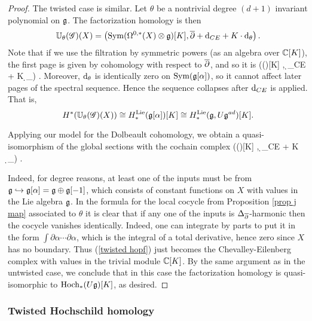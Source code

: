 \begin{proof}
The twisted case is similar. 
Let $\theta$ be a nontrivial degree $(d+1)$ invariant polynomial on $\mathfrak g$. 
The factorization homology is then 
\[
\mathbb U_\theta (\mathscr G)(X) = \left({\rm Sym}(\Omega^{0,*}(X) \otimes \mathfrak g)[K] , \overline{\partial} + {\rm d}_{CE} + K \cdot {\rm d}_\theta\right) .
\]
Note that if we use the filtration by symmetric powers (as an algebra over $\mathbb C[K]$),
the first page is given by cohomology with respect to $\overline{\partial}$,
and so it is
\beqn\label{twisted hopf}
\left(\Sym(\fg[\alpha])[K] ,  \d_{CE} + K \cdot \d_\theta \right) .
\eeqn
Moreover, ${\rm d}_\theta$ is identically zero on ${\rm Sym}(\mathfrak g[\alpha])$, so it cannot affect later pages of the spectral sequence. 
Hence the sequence collapses after ${\rm d}_{CE}$ is applied.
That is, 
\[
H^*(\mathbb U_\theta (\mathscr G)(X)) \cong H^{\rm Lie}_*(\mathfrak g[\alpha])[K] \cong H^{\rm Lie}_*(\mathfrak g, U\mathfrak g^{ad})[K].
\]

Applying our model for the Dolbeault cohomology, we obtain a quasi-isomorphism of the global sections with the cochain complex
\beqn\label{twisted hopf}
\left(\Sym(\fg[\alpha])[K] ,  \d_{CE} + K \cdot \d_\theta \right) .
\eeqn

Indeed, for degree reasons, at least one of the inputs must be from $\mathfrak g \hookrightarrow \mathfrak g[\alpha] = \mathfrak g \oplus \mathfrak g[-1]$, which consists of constant functions on $X$ with values in the Lie algebra $\mathfrak g$. 
In the formula for the local cocycle from Proposition \ref{prop j map} associated to $\theta$ it is clear that if any one of the inputs is $\Delta_{\overline{\partial}}$-harmonic then the cocycle vanishes identically. 
Indeed, one can integrate by parts to put it in the form $\int \partial \alpha \cdots \partial \alpha$, which is the integral of a total derivative, hence zero since $X$ has no boundary.
Thus (\ref{twisted hopf}) just becomes the Chevalley-Eilenberg complex with values in the trivial module $\mathbb C[K]$. 
By the same argument as in the untwisted case, we conclude that in this case the factorization homology is quasi-isomorphic to ${\rm Hoch}_*(U \mathfrak g)[K]$, as desired.
\end{proof}

\subsubsection{Twisted Hochschild homology}

